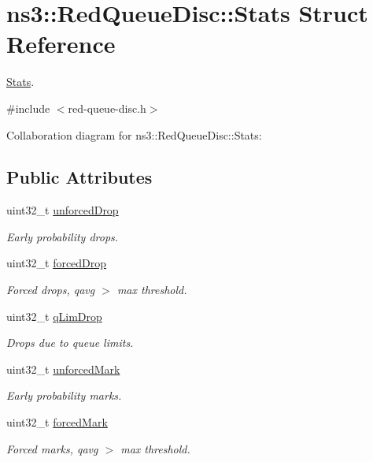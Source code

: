 \hypertarget{structns3_1_1RedQueueDisc_1_1Stats}{}\section{ns3\+:\+:Red\+Queue\+Disc\+:\+:Stats Struct Reference}
\label{structns3_1_1RedQueueDisc_1_1Stats}


\hyperlink{structns3_1_1RedQueueDisc_1_1Stats}{Stats}.  




{\ttfamily \#include $<$red-\/queue-\/disc.\+h$>$}



Collaboration diagram for ns3\+:\+:Red\+Queue\+Disc\+:\+:Stats\+:
\subsection*{Public Attributes}
\begin{DoxyCompactItemize}
\item 
uint32\+\_\+t \hyperlink{structns3_1_1RedQueueDisc_1_1Stats_a242027f6eb7d30e2cd636c52080e2c73}{unforced\+Drop}
\begin{DoxyCompactList}\small\item\em Early probability drops. \end{DoxyCompactList}\item 
uint32\+\_\+t \hyperlink{structns3_1_1RedQueueDisc_1_1Stats_a56951fa215564c8d2e59aa046dc3e494}{forced\+Drop}
\begin{DoxyCompactList}\small\item\em Forced drops, qavg $>$ max threshold. \end{DoxyCompactList}\item 
uint32\+\_\+t \hyperlink{structns3_1_1RedQueueDisc_1_1Stats_a2374b8b8386ad6e42435bf1b29109bad}{q\+Lim\+Drop}
\begin{DoxyCompactList}\small\item\em Drops due to queue limits. \end{DoxyCompactList}\item 
uint32\+\_\+t \hyperlink{structns3_1_1RedQueueDisc_1_1Stats_aa974fb3ee97c612e0a6d77259a3672df}{unforced\+Mark}
\begin{DoxyCompactList}\small\item\em Early probability marks. \end{DoxyCompactList}\item 
uint32\+\_\+t \hyperlink{structns3_1_1RedQueueDisc_1_1Stats_a577b385784d9852f6557e6ec36fc9120}{forced\+Mark}
\begin{DoxyCompactList}\small\item\em Forced marks, qavg $>$ max threshold. \end{DoxyCompactList}\end{DoxyCompactItemize}


